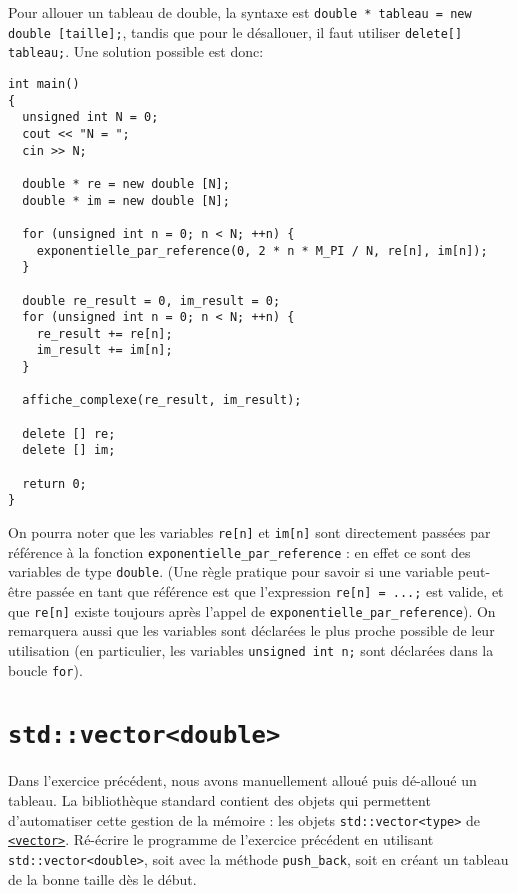 \documentclass{book}
\newcommand{\inline}[1]{\texttt{#1}}
\begin{document}
\begin{correction}
Pour allouer un tableau de double, la syntaxe est \inline{double * tableau = new double [taille];}, tandis que pour le désallouer, il faut utiliser 
\inline{delete[] tableau;}. Une solution possible est donc:
\begin{verbatim}
int main() 
{
  unsigned int N = 0;
  cout << "N = ";
  cin >> N;

  double * re = new double [N];
  double * im = new double [N];

  for (unsigned int n = 0; n < N; ++n) {
    exponentielle_par_reference(0, 2 * n * M_PI / N, re[n], im[n]);
  }

  double re_result = 0, im_result = 0;
  for (unsigned int n = 0; n < N; ++n) {
    re_result += re[n];
    im_result += im[n];
  }

  affiche_complexe(re_result, im_result);

  delete [] re;
  delete [] im;

  return 0;
}
\end{verbatim}
On pourra noter que les variables \inline{re[n]} et \inline{im[n]} sont directement passées par référence à la fonction \inline{exponentielle_par_reference} : en effet ce sont des variables de type \inline{double}. (Une règle pratique pour savoir si une variable peut-être passée en tant que référence est que l'expression \inline{re[n] = ...;} est valide, et que \inline{re[n]} existe toujours après l'appel de \inline{exponentielle_par_reference}). On remarquera aussi que les variables sont déclarées le plus proche possible de leur utilisation (en particulier, les variables \inline{unsigned int n;} sont déclarées dans la boucle \inline{for}). 
\end{correction}


\section{\texttt{std::vector<double>}}

Dans l'exercice précédent, nous avons manuellement alloué puis dé-alloué un tableau. La bibliothèque standard contient des objets qui permettent d'automatiser cette gestion de la mémoire : les objets \inline{std::vector<type>} de \href{http://en.cppreference.com/w/cpp/header/vector}{\inline{<vector>}}. Ré-écrire le programme de l'exercice précédent en utilisant \inline{std::vector<double>}, soit avec la méthode \texttt{push\_back}, soit en créant un tableau de la bonne taille dès le début.
\end{document}
